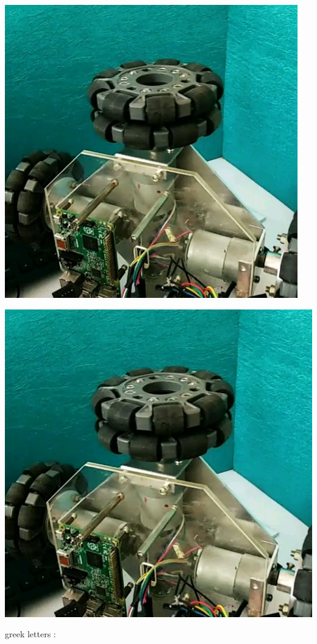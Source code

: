 \documentclass[11pt]{article}
\begin{document}
\begin{center}
\includegraphics[width=5in,height=5in]{robo.jpg}
\end{center}
\begin{center}
\includegraphics[scale=0.5,angle=45]{robo.jpg}
\end{center}
greek letters :
\end{document}
